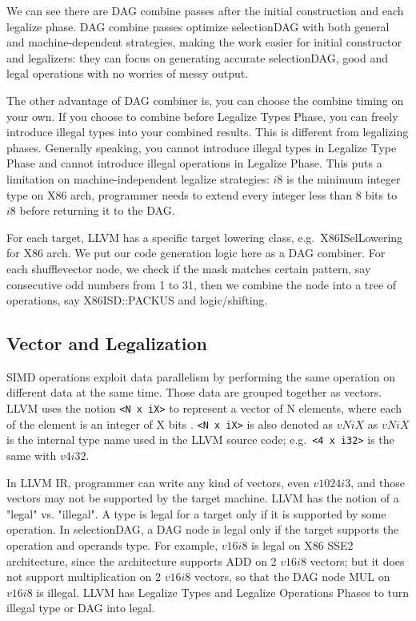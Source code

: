 We can see there are DAG combine passes after the initial construction and each legalize phase\cite{llvm_code_gen}. DAG combine passes optimize selectionDAG with both general and machine-dependent strategies, making the work easier for initial constructor and legalizers: they can focus on generating accurate selectionDAG, good and legal operations with no worries of messy output.

The other advantage of DAG combiner is, you can choose the combine timing on your own. If you choose to combine before Legalize Types Phase, you can freely introduce illegal types into your combined results. This is different from legalizing phases. Generally speaking, you cannot introduce illegal types in Legalize Type Phase and cannot introduce illegal operations in Legalize Phase. This puts a limitation on machine-independent legalize strategies: $i8$ is the minimum integer type on X86 arch, programmer needs to extend every integer less than 8 bits to $i8$ before returning it to the DAG.

For each target, LLVM has a specific target lowering class, e.g.\ X86ISelLowering for X86 arch. We put our code generation logic here as a DAG combiner. For each shufflevector node, we check if the mask matches certain pattern, say consecutive odd numbers from 1 to 31, then we combine the node into a tree of operations, say X86ISD::PACKUS and logic/shifting.

\subsection{Vector and Legalization}
SIMD operations exploit data parallelism by performing the same operation on different data at the same time. Those data are grouped together as vectors. LLVM uses the notion \verb|<N x iX>| to represent a vector of N elements, where each of the element is an integer of X bits \cite{llvm_lang_ref, hybrid_simd_type_legalize}. \verb|<N x iX>| is also denoted as $vNiX$ as $vNiX$ is the internal type name used in the LLVM source code; e.g.\ \verb|<4 x i32>| is the same with $v4i32$.

In LLVM IR, programmer can write any kind of vectors, even $v1024i3$, and those vectors may not be supported by the target machine. LLVM has the notion of a "legal" vs. "illegal". A type is legal for a target only if it is supported by some operation. In selectionDAG, a DAG node is legal only if the target supports the operation and operands type. For example, $v16i8$ is legal on X86 SSE2 architecture, since the architecture supports ADD on 2 $v16i8$ vectors; but it does not support multiplication on 2 $v16i8$ vectors, so that the DAG node MUL on $v16i8$ is illegal. LLVM has Legalize Types and Legalize Operations Phases to turn illegal type or DAG into legal\cite{llvm_code_gen}.

